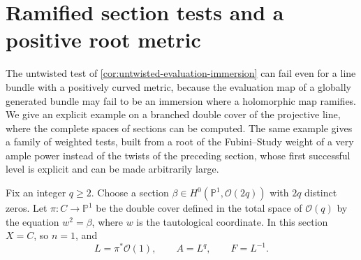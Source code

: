 \section{Ramified section tests and a positive root metric}
\label{sec:ramified-root-section-tests}

The untwisted test of \cref{cor:untwisted-evaluation-immersion} can fail even for a line bundle with a positively curved metric, because the evaluation map of a globally generated bundle may fail to be an immersion where a holomorphic map ramifies. We give an explicit example on a branched double cover of the projective line, where the complete spaces of sections can be computed. The same example gives a family of weighted tests, built from a root of the Fubini--Study weight of a very ample power instead of the twists of the preceding section, whose first successful level is explicit and can be made arbitrarily large.

Fix an integer $q\geq2$. Choose a section $\beta\in H^0(\mathbb P^1,\mathcal O(2q))$ with $2q$ distinct zeros. Let $\pi\colon C\to\mathbb P^1$ be the double cover defined in the total space of $\mathcal O(q)$ by the equation $w^2=\beta$, where $w$ is the tautological coordinate. In this section $X=C$, so $n=1$, and
\[
 L=\pi^*\mathcal O(1),\qquad A=L^q,\qquad F=L^{-1}.
\]

